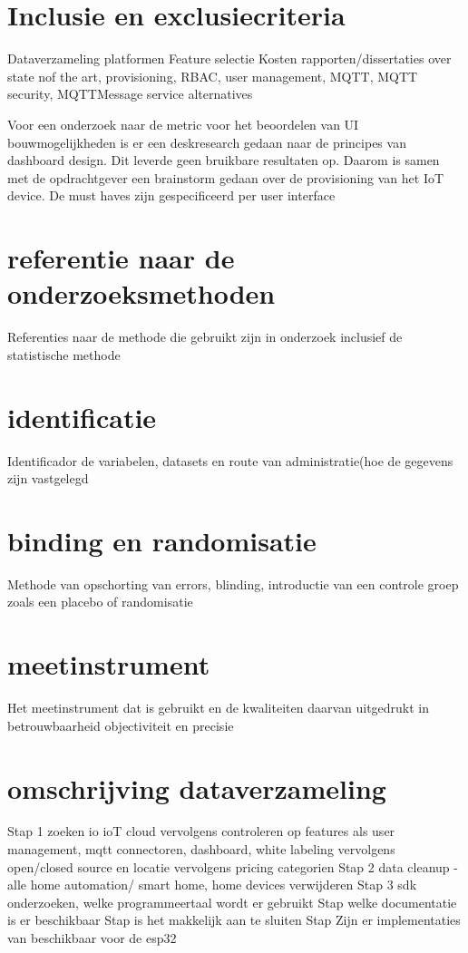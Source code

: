 \section{Inclusie en exclusiecriteria}
Dataverzameling platformen
Feature selectie
Kosten
rapporten/dissertaties over state nof the art, provisioning, RBAC, user management, MQTT, MQTT security, MQTTMessage service alternatives


Voor een onderzoek naar de metric voor het beoordelen van UI bouwmogelijkheden  is er een deskresearch gedaan naar de principes van dashboard design. Dit leverde geen bruikbare resultaten op. Daarom is samen met de opdrachtgever een brainstorm gedaan over de provisioning van het IoT device. De must haves zijn gespecificeerd per user interface


\section{referentie naar de onderzoeksmethoden}
Referenties naar de methode die gebruikt zijn in onderzoek inclusief de statistische methode

\section{identificatie}
Identificador de variabelen, datasets en route van administratie(hoe de gegevens zijn vastgelegd

\section{binding en randomisatie}
Methode van opschorting van errors, blinding, introductie van een controle groep zoals een placebo of randomisatie

\section{meetinstrument}
Het meetinstrument dat is gebruikt en de kwaliteiten daarvan uitgedrukt in betrouwbaarheid objectiviteit en precisie

\section{omschrijving dataverzameling}
Stap 1 zoeken io ioT cloud
vervolgens controleren op features als user management, mqtt connectoren, dashboard, white labeling
vervolgens open/closed source en locatie
vervolgens pricing categorien
Stap 2 data cleanup
- alle home automation/ smart home, home devices verwijderen
Stap 3
sdk onderzoeken, welke programmeertaal wordt er gebruikt 
Stap
welke documentatie is er beschikbaar
Stap
is het makkelijk aan te sluiten
Stap
Zijn er implementaties van beschikbaar voor de esp32

